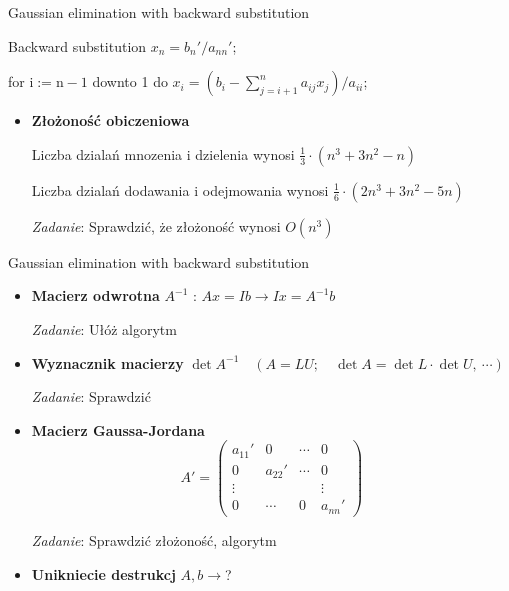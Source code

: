 \begin{frame}{Gaussian elimination with backward substitution}
\begin{exampleblock}{Backward substitution}
$x_{n}=b_{n}'/a_{nn}'$;

for $\mathrm{i}:=\mathrm{n}-1$ downto 1 do $x_{i}=(b_{i}-\displaystyle \sum_{j=i+1}^{n}a_{ij}x_{j})/a_{ii}$;
\end{exampleblock}

\begin{itemize}
\item \textbf{Złożoność obiczeniowa}

Liczba dziala\'{n} mnozenia $\mathrm{i}$ dzielenia wynosi $\displaystyle \frac{1}{3}\cdot(n^{3}+3n^{2}-n)$

Liczba dziala\'{n} dodawania $\mathrm{i}$ odejmowania wynosi $\displaystyle \frac{1}{6}\cdot(2n^{3}+3n^{2}-5n)$

\begin{flushright}
{\it Zadanie}: Sprawdzić, że złożoność wynosi $O(n^{3})$
\end{flushright} 

\end{itemize}

\end{frame}
\begin{frame}{Gaussian elimination with backward substitution}
\begin{itemize}
\item \textbf{Macierz odwrotna} \newline
$A^{-1}$ : $Ax=Ib\rightarrow Ix=A^{-1}b$
\begin{flushright}
{\it Zadanie}: Ułóż algorytm
\end{flushright}
\item \textbf{Wyznacznik macierzy}
$\det A^{-1}\quad(A=LU;\quad \det A=\det L\cdot\det U,\ \cdots)$
\begin{flushright}
{\it Zadanie}: Sprawdzić
\end{flushright}
\item \textbf{Macierz Gaussa-Jordana}
$$
A'=\left(\begin{array}{llll}
a_{11}' & 0 & \cdots & 0\\
0 & a_{22}' & \cdots & 0\\
\vdots &  &  & \vdots\\
 0 & \cdots & 0 & a_{nn}'
\end{array}\right)
$$
\begin{flushright}
{\it Zadanie}: Sprawdzić złożoność, algorytm
\end{flushright}
\item \textbf{Unikniecie destrukcj}
$A,  b\rightarrow$?
\end{itemize}
\end{frame}
